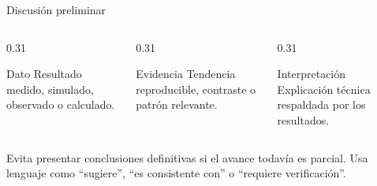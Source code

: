 \begin{frame}{Discusión preliminar}
  \begin{columns}[T,onlytextwidth]
    \begin{column}{0.31\textwidth}
      \begin{UCBlock}{Dato}
        Resultado medido, simulado, observado o calculado.
      \end{UCBlock}
    \end{column}
    \begin{column}{0.31\textwidth}
      \begin{UCBlock}{Evidencia}
        Tendencia reproducible, contraste o patrón relevante.
      \end{UCBlock}
    \end{column}
    \begin{column}{0.31\textwidth}
      \begin{UCBlock}{Interpretación}
        Explicación técnica respaldada por los resultados.
      \end{UCBlock}
    \end{column}
  \end{columns}
  \begin{UCKeyPoint}
    Evita presentar conclusiones definitivas si el avance todavía es parcial. Usa lenguaje como “sugiere”, “es consistente con” o “requiere verificación”.
  \end{UCKeyPoint}
\end{frame}
